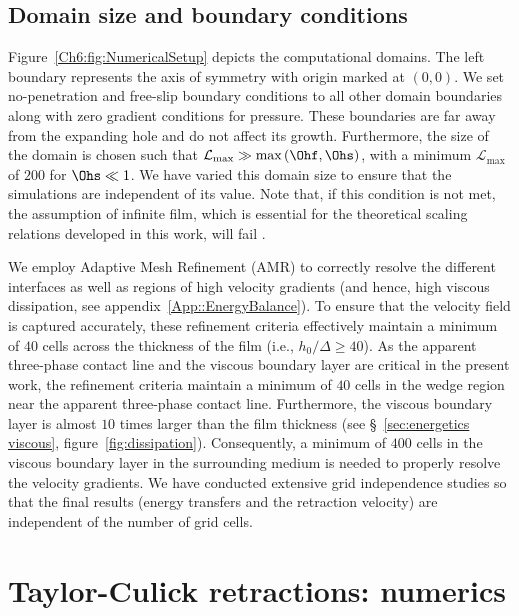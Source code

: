 \subsection{Domain size and boundary conditions}
Figure~\ref{Ch6:fig:NumericalSetup} depicts the computational domains. The left boundary represents the axis of symmetry with origin marked at $(0, 0)$. We set no-penetration and free-slip boundary conditions to all other domain boundaries along with zero gradient conditions for pressure. These boundaries are far away from the expanding hole and do not affect its growth. Furthermore, the size of the domain is chosen such that $\mathcal{L}_{\text{max}} \gg \text{max}\left(\Ohf, \Ohs\right)$, with a minimum $\mathcal{L}_{\text{max}}$ of $200$ for $\Ohs \ll 1$. We have varied this domain size to ensure that the simulations are independent of its value. Note that, if this condition is not met, the assumption of infinite film, which is essential for the theoretical scaling relations developed in this work, will fail \citep{deka2020revisiting}. 

We employ Adaptive Mesh Refinement (AMR) to correctly resolve the different interfaces as well as regions of high velocity gradients (and hence, high viscous dissipation, see appendix~\ref{App::EnergyBalance}). To ensure that the velocity field is captured accurately, these refinement criteria \citep[see][]{basiliskvatsaltc} effectively maintain a minimum of $40$ cells across the thickness of the film (i.e., $h_0/\Delta \ge 40$). As the apparent three-phase contact line and the viscous boundary layer are critical in the present work, the refinement criteria maintain a minimum of $40$ cells in the wedge region near the apparent three-phase contact line. Furthermore, the viscous boundary layer is almost $10$ times larger than the film thickness (see \S~\ref{sec:energetics viscous}, figure~\ref{fig:dissipation}). Consequently, a minimum of $400$ cells in the viscous boundary layer in the surrounding medium is needed to properly resolve the velocity gradients. We have conducted extensive grid independence studies so that the final results (energy transfers and the retraction velocity) are independent of the number of grid cells. 

\section{Taylor-Culick retractions: numerics}\label{Ch6:sec:Num results}

